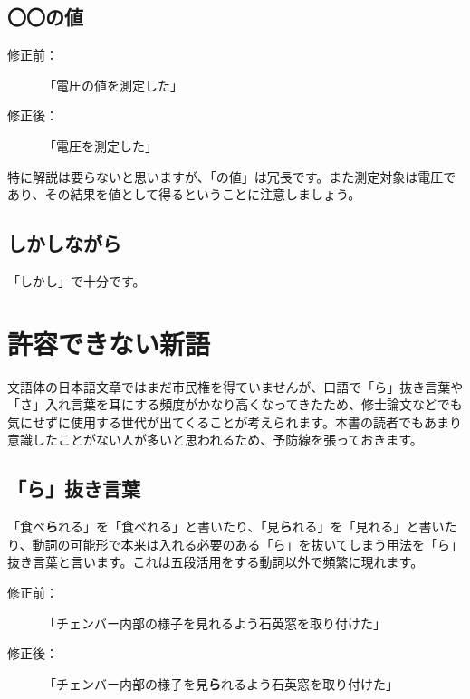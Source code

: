 
\subsection{〇〇の値}

\begin{description}
\item[修正前：]「電圧の値を測定した」
\item[修正後：]「電圧を測定した」
\end{description}

特に解説は要らないと思いますが、「の値」は冗長です。また測定対象は電圧であり、その結果を値として得るということに注意しましょう。

\subsection{しかしながら}

「しかし」で十分です。

\section{許容できない新語}

文語体の日本語文章ではまだ市民権を得ていませんが、口語で「ら」抜き言葉や「さ」入れ言葉を耳にする頻度がかなり高くなってきたため、修士論文などでも気にせずに使用する世代が出てくることが考えられます。本書の読者でもあまり意識したことがない人が多いと思われるため、予防線を張っておきます。

\subsection{「ら」抜き言葉}

「食べ{\bf ら}れる」を「食べれる」と書いたり、「見{\bf ら}れる」を「見れる」と書いたり、動詞の可能形で本来は入れる必要のある「ら」を抜いてしまう用法を「ら」抜き言葉と言います。これは五段活用をする動詞以外で頻繁に現れます。

\begin{description}
\item[修正前：]「チェンバー内部の様子を見れるよう石英窓を取り付けた」
\item[修正後：]「チェンバー内部の様子を見{\bf ら}れるよう石英窓を取り付けた」
\end{description}

